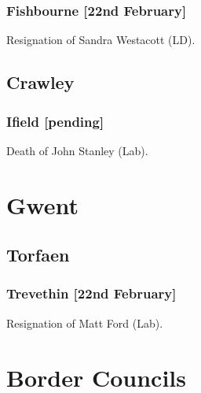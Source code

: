 \documentclass[a4paper,openany]{book}
\begin{document}
\begin{resultsiii}
\subsubsection*{Fishbourne \hspace*{\fill}\nolinebreak[1]%
\enspace\hspace*{\fill}
[22nd February]}


Resignation of Sandra Westacott (LD).

\subsection*{Crawley}

\subsubsection*{Ifield \hspace*{\fill}\nolinebreak[1]%
\enspace\hspace*{\fill}
[pending]}


Death of John Stanley (Lab).

\section{Gwent}

\subsection*{Torfaen}

\subsubsection*{Trevethin \hspace*{\fill}\nolinebreak[1]%
\enspace\hspace*{\fill}
[22nd February]}


Resignation of Matt Ford (Lab).

\section{Border Councils}


\end{resultsiii}
\end{document}
